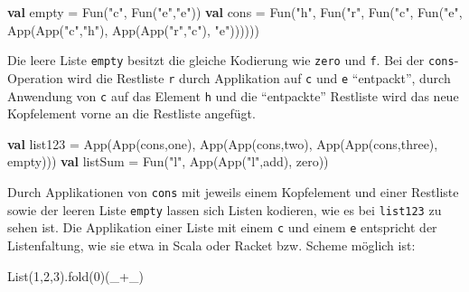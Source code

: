\documentclass[]{article}
\newenvironment{Shaded}{}{}
\newcommand{\DecValTok}[1]{\textcolor[rgb]{0.25,0.63,0.44}{#1}}
\newcommand{\FunctionTok}[1]{\textcolor[rgb]{0.02,0.16,0.49}{#1}}
\newcommand{\KeywordTok}[1]{\textcolor[rgb]{0.00,0.44,0.13}{\textbf{#1}}}
\newcommand{\NormalTok}[1]{#1}
\newcommand{\StringTok}[1]{\textcolor[rgb]{0.25,0.44,0.63}{#1}}
\begin{document}
\begin{Shaded}
\begin{Highlighting}[]
\KeywordTok{val}\NormalTok{ empty = }\FunctionTok{Fun}\NormalTok{(}\StringTok{"c"}\NormalTok{, }\FunctionTok{Fun}\NormalTok{(}\StringTok{"e"}\NormalTok{,}\StringTok{"e"}\NormalTok{))}
\KeywordTok{val}\NormalTok{ cons =}
  \FunctionTok{Fun}\NormalTok{(}\StringTok{"h"}\NormalTok{, }\FunctionTok{Fun}\NormalTok{(}\StringTok{"r"}\NormalTok{, }\FunctionTok{Fun}\NormalTok{(}\StringTok{"c"}\NormalTok{, }\FunctionTok{Fun}\NormalTok{(}\StringTok{"e"}\NormalTok{,}
    \FunctionTok{App}\NormalTok{(}\FunctionTok{App}\NormalTok{(}\StringTok{"c"}\NormalTok{,}\StringTok{"h"}\NormalTok{), }\FunctionTok{App}\NormalTok{(}\FunctionTok{App}\NormalTok{(}\StringTok{"r"}\NormalTok{,}\StringTok{"c"}\NormalTok{), }\StringTok{"e"}\NormalTok{))))))}
\end{Highlighting}
\end{Shaded}

Die leere Liste \texttt{empty} besitzt die gleiche Kodierung wie
\texttt{zero} und \texttt{f}. Bei der \texttt{cons}-Operation wird die
Restliste \texttt{r} durch Applikation auf \texttt{c} und \texttt{e}
``entpackt'', durch Anwendung von \texttt{c} auf das Element \texttt{h}
und die ``entpackte'' Restliste wird das neue Kopfelement vorne an die
Restliste angefügt.

\begin{Shaded}
\begin{Highlighting}[]
\KeywordTok{val}\NormalTok{ list123 = }\FunctionTok{App}\NormalTok{(}\FunctionTok{App}\NormalTok{(cons,one), }\FunctionTok{App}\NormalTok{(}\FunctionTok{App}\NormalTok{(cons,two), }\FunctionTok{App}\NormalTok{(}\FunctionTok{App}\NormalTok{(cons,three), empty)))}
\KeywordTok{val}\NormalTok{ listSum = }\FunctionTok{Fun}\NormalTok{(}\StringTok{"l"}\NormalTok{, }\FunctionTok{App}\NormalTok{(}\FunctionTok{App}\NormalTok{(}\StringTok{"l"}\NormalTok{,add), zero))}
\end{Highlighting}
\end{Shaded}

Durch Applikationen von \texttt{cons} mit jeweils einem Kopfelement und
einer Restliste sowie der leeren Liste \texttt{empty} lassen sich Listen
kodieren, wie es bei \texttt{list123} zu sehen ist. Die Applikation
einer Liste mit einem \texttt{c} und einem \texttt{e} entspricht der
Listenfaltung, wie sie etwa in Scala oder Racket bzw. Scheme möglich
ist:

\begin{Shaded}
\begin{Highlighting}[]
\NormalTok{List(}\DecValTok{1}\NormalTok{,}\DecValTok{2}\NormalTok{,}\DecValTok{3}\NormalTok{).}\FunctionTok{fold}\NormalTok{(}\DecValTok{0}\NormalTok{)(\_+\_)}
\end{Highlighting}
\end{Shaded}
\end{document}
